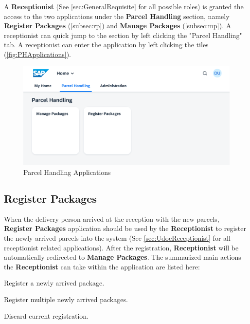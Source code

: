 A \textbf{Receptionist} (See \autoref{sec:GeneralRequisite} for all possible roles) is granted the access to the two applications under the \textbf{Parcel Handling} section, namely \textbf{Register Packages} (\autoref{subsec:rp}) and \textbf{Manage Packages} (\autoref{subsec:mp}). A receptionist can quick jump to the section by left clicking the "Parcel Handling" tab. A receptionist can enter the application by left clicking the tiles (\autoref{fig:PHApplications}).

\begin{figure}[htb!]
	\centering
	\includegraphics[width=1\linewidth]{images/user_doc/overviews/ParcelHandlingTab.png}
	\caption{Parcel Handling Applications}
	\label{fig:PHApplications}
\end{figure}


\subsection{Register Packages}
\label{subsec:rp}

When the delivery person arrived at the reception with the new parcels, \textbf{Register Packages} application should be used by the \textbf{Receptionist} to register the newly arrived parcels into the system (See \autoref{sec:UdocReceptionist} for all receptionist related applications).  After the registration, \textbf{Receptionist} will be automatically redirected to  \textbf{Manage Packages}.
The summarized main actions the \textbf{Receptionist} can take within the application are listed here:

\begin{compactenum}
	\item Register a newly arrived package.
    \item Register multiple newly arrived packages.
    \item Discard current registration.
\end{compactenum}

